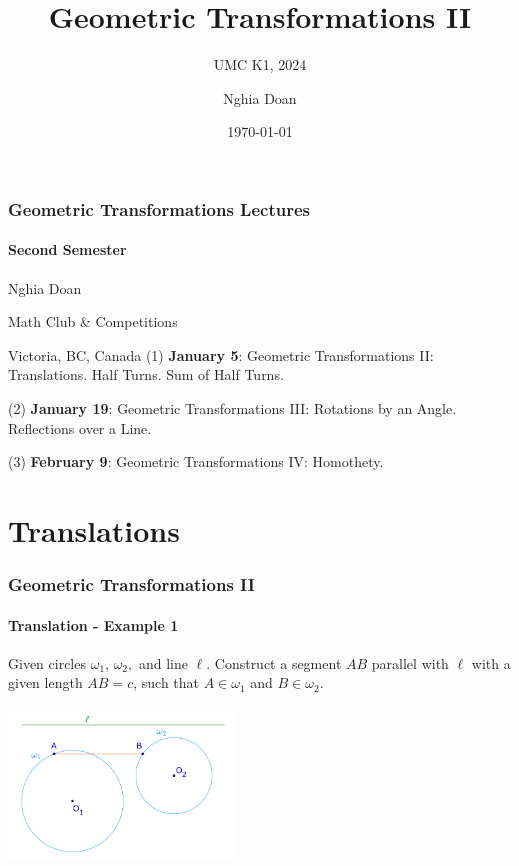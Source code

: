 \documentclass[8pt,xcolor=table,dvipsnames]{beamer}
\title{Geometric Transformations II}
\subtitle{UMC K1, 2024}
\author{Nghia Doan}
\institute{MCC Club \& Competitions}
\date{\today}
\begin{document}
\begin{frame}[t]
    \frametitle{Geometric Transformations Lectures}
    \framesubtitle{Second Semester}
    \bigbreak
    Nghia Doan

    \bigbreak
    Math Club \& Competitions

    Victoria, BC, Canada
    \bigbreak
    \bigbreak
    (1) \textbf{January 5}: Geometric Transformations II: Translations. Half Turns. Sum of Half Turns.

    \bigbreak
    (2) \textbf{January 19}: Geometric Transformations III: Rotations by an Angle. Reflections over a Line.

    \bigbreak
    (3) \textbf{February 9}: Geometric Transformations IV: Homothety.
\end{frame}

\section{Translations}

\begin{frame}[t]
    \frametitle{Geometric Transformations II}
    \framesubtitle{Translation - Example 1}
    \begin{example}
        Given circles $\omega_1$, $\omega_2,$ and line $\ell.$
        \bigbreak
        Construct a segment $AB$ parallel with $\ell$ with a given length $AB=c$, such that $A \in \omega_1$ and $B \in \omega_2.$
    \end{example}
    \bigbreak
    \begin{center}
        \includegraphics[width=6cm]{./svg/pdf/translation-5.pdf}
    \end{center}
\end{frame}
\end{document}
